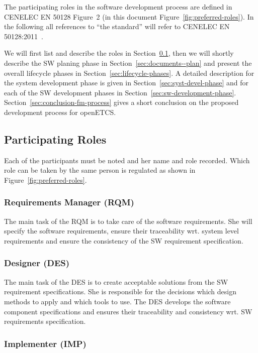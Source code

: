 
The participating roles in the software development process are defined in
CENELEC EN 50128 Figure~2 (in this document
Figure~\ref{fig:preferred-roles}). In the following all references to ``the
standard'' will refer to CENELEC EN 50128:2011~\cite{EN-50128}.

We will first list and describe the roles in
Section~\ref{sec:participating-roles}, then we will shortly describe the SW
planing phase in Section~\ref{sec:documents--plan} and present the overall
lifecycle phases in Section~\ref{sec:lifecycle-phases}. A detailed description
for the system development phase is given in Section~\ref{sec:syst-devel-phase}
and for each of the SW development phases in
Section~\ref{sec:sw-development-phase}. Section~\ref{sec:conclusion-fm-process}
gives a short conclusion on the proposed development process for openETCS.

\subsection{Participating Roles}
\label{sec:participating-roles}

Each of the participants must be noted and her name and role recorded. Which
role can be taken by the same person is regulated as shown in
Figure~\ref{fig:preferred-roles}.

\subsubsection{Requirements Manager (RQM)}
\label{sec:requ-magang-rqm}

The main task of the RQM is to take care of the software requirements. She will
specify the software requirements, ensure their traceability wrt. system level
requirements and ensure the consistency of the SW requirement specification.

\subsubsection{Designer (DES)}
\label{sec:designer}

The main task of the DES is to create acceptable solutions from the SW
requirement specifications. She is responsible for the decisions which design
methods to apply and which tools to use. The DES develops the software component
specifications and ensures their traceability and consistency wrt. SW
requirements specification.

\subsubsection{Implementer (IMP)}
\label{sec:implementer}


